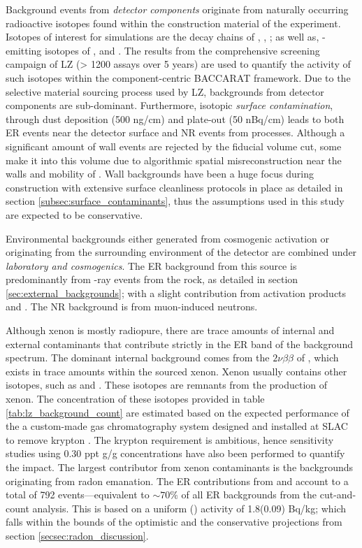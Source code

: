 Background events from \textit{detector components} originate from naturally occurring radioactive isotopes found within the construction material of the experiment. Isotopes of interest for simulations are the decay chains of \UTTE{}, \UTTF{}, \ThTTT{}; as well as, \gamma-emitting isotopes of \KFZ{}, \CsOTS{} and \CoSZ{}. The results from the comprehensive screening campaign of LZ (> 1200 assays over 5 years) are used to quantify the activity of such isotopes within the component-centric BACCARAT framework. Due to the selective material sourcing process used by LZ, backgrounds from detector components are sub-dominant. Furthermore, isotopic \textit{surface contamination}, through dust deposition (500 ng/cm\squared{}) and \RnTTT{} plate-out (50 nBq/cm\squared) leads to both ER events near the detector surface and NR events from \alphaN{} processes. Although a significant amount of wall events are rejected by the fiducial volume cut, some make it into this volume due to algorithmic spatial misreconstruction near the walls and mobility of \BiTOZ{}. Wall backgrounds have been a huge focus during construction with extensive surface cleanliness protocols in place as detailed in section \ref{subsec:surface_contaminants}, thus the assumptions used in this study are expected to be conservative.

%

%

Environmental backgrounds either generated from cosmogenic activation or originating from the surrounding environment of the detector are combined under \textit{laboratory and cosmogenics}. The ER background from this source is predominantly from \gamma-ray events from the rock, as detailed in section \ref{sec:external_backgrounds}; with a slight contribution from activation products \XeOTS{} and \ScFS{}. The NR background is from muon-induced neutrons. 

Although xenon is mostly radiopure, there are trace amounts of internal and external contaminants that contribute strictly in the ER band of the background spectrum. The dominant internal background comes from the $2\nu\beta\beta$ of \XeOTS{}, which exists in trace amounts within the sourced xenon. Xenon usually contains other isotopes, such as \KrEF{} and \ArTN{}. These isotopes are remnants from the production of xenon. The concentration of these isotopes provided in table \ref{tab:lz_background_count} are estimated based on the expected performance of the a custom-made gas chromatography system designed and installed at SLAC to remove krypton \cite{lz_tdr}. The krypton requirement is ambitious, hence sensitivity studies using 0.30 ppt g/g concentrations have also been performed to quantify the impact. The largest contributor from xenon contaminants is the backgrounds originating from radon emanation. The ER contributions from \RnTTT{} and \RnTTZ{} account to a total of 792 events---equivalent to $\sim70\%$ of all ER backgrounds from the cut-and-count analysis. This is based on a uniform \RnTTT{}(\RnTTZ{}) activity of 1.8(0.09) \micro{}Bq/kg; which falls within the bounds of the optimistic and the conservative projections from section \ref{secsec:radon_discussion}.

